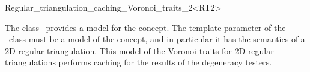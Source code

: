 

\begin{ccRefClass}{Regular_triangulation_caching_Voronoi_traits_2<RT2>}


\ccDefinition

The class \ccRefName\ provides a model for the 
concept. The template parameter of the \ccRefName\ class must be a
model of the  concept, and in particular it has
the semantics of a 2D regular triangulation. This model of
the Voronoi traits for 2D regular triangulations performs caching for the
results of the degeneracy testers.



\ccIsModel
{}

\ccTypes
{}
\ccGlue
{}

\ccSeeAlso
{}\\
\\
\\
\\
\end{ccRefClass}


